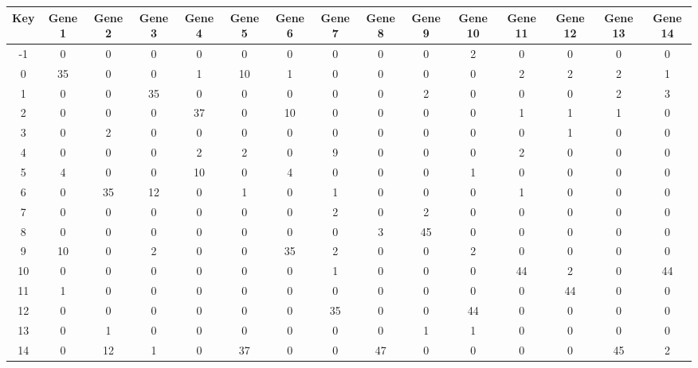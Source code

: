 \begin{tabular}{|c|c|c|c|c|c|c|c|c|c|c|c|c|c|c|}
\hline
Key & Gene 1 & Gene 2 & Gene 3 & Gene 4 & Gene 5 & Gene 6 & Gene 7 & Gene 8 & Gene 9 & Gene 10 & Gene 11 & Gene 12 & Gene 13 & Gene 14 \\
\hline
-1 & 0 & 0 & 0 & 0 & 0 & 0 & 0 & 0 & 0 & 2 & 0 & 0 & 0 & 0 \\
0 & 35 & 0 & 0 & 1 & 10 & 1 & 0 & 0 & 0 & 0 & 2 & 2 & 2 & 1 \\
1 & 0 & 0 & 35 & 0 & 0 & 0 & 0 & 0 & 2 & 0 & 0 & 0 & 2 & 3 \\
2 & 0 & 0 & 0 & 37 & 0 & 10 & 0 & 0 & 0 & 0 & 1 & 1 & 1 & 0 \\
3 & 0 & 2 & 0 & 0 & 0 & 0 & 0 & 0 & 0 & 0 & 0 & 1 & 0 & 0 \\
4 & 0 & 0 & 0 & 2 & 2 & 0 & 9 & 0 & 0 & 0 & 2 & 0 & 0 & 0 \\
5 & 4 & 0 & 0 & 10 & 0 & 4 & 0 & 0 & 0 & 1 & 0 & 0 & 0 & 0 \\
6 & 0 & 35 & 12 & 0 & 1 & 0 & 1 & 0 & 0 & 0 & 1 & 0 & 0 & 0 \\
7 & 0 & 0 & 0 & 0 & 0 & 0 & 2 & 0 & 2 & 0 & 0 & 0 & 0 & 0 \\
8 & 0 & 0 & 0 & 0 & 0 & 0 & 0 & 3 & 45 & 0 & 0 & 0 & 0 & 0 \\
9 & 10 & 0 & 2 & 0 & 0 & 35 & 2 & 0 & 0 & 2 & 0 & 0 & 0 & 0 \\
10 & 0 & 0 & 0 & 0 & 0 & 0 & 1 & 0 & 0 & 0 & 44 & 2 & 0 & 44 \\
11 & 1 & 0 & 0 & 0 & 0 & 0 & 0 & 0 & 0 & 0 & 0 & 44 & 0 & 0 \\
12 & 0 & 0 & 0 & 0 & 0 & 0 & 35 & 0 & 0 & 44 & 0 & 0 & 0 & 0 \\
13 & 0 & 1 & 0 & 0 & 0 & 0 & 0 & 0 & 1 & 1 & 0 & 0 & 0 & 0 \\
14 & 0 & 12 & 1 & 0 & 37 & 0 & 0 & 47 & 0 & 0 & 0 & 0 & 45 & 2 \\
\hline
\end{tabular}